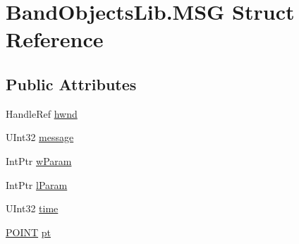 \hypertarget{struct_band_objects_lib_1_1_m_s_g}{\section{Band\+Objects\+Lib.\+M\+S\+G Struct Reference}
\label{struct_band_objects_lib_1_1_m_s_g}
}
\subsection*{Public Attributes}
\begin{DoxyCompactItemize}
\item 
Handle\+Ref \hyperlink{struct_band_objects_lib_1_1_m_s_g_a42fd9b00ed46700b703040de02bd1020}{hwnd}
\item 
U\+Int32 \hyperlink{struct_band_objects_lib_1_1_m_s_g_a887829baa8b39e3191660e3b1af1b989}{message}
\item 
Int\+Ptr \hyperlink{struct_band_objects_lib_1_1_m_s_g_ae33250f9183c57d5acaf4d805ddfb04e}{w\+Param}
\item 
Int\+Ptr \hyperlink{struct_band_objects_lib_1_1_m_s_g_a23a04821180867f664d66ffd0c0cbe28}{l\+Param}
\item 
U\+Int32 \hyperlink{struct_band_objects_lib_1_1_m_s_g_afa248537123e634e2eb593fce7ba444c}{time}
\item 
\hyperlink{struct_band_objects_lib_1_1_p_o_i_n_t}{P\+O\+I\+N\+T} \hyperlink{struct_band_objects_lib_1_1_m_s_g_acb1834e81cf9b7e72714c8862cb5cc0d}{pt}
\end{DoxyCompactItemize}



